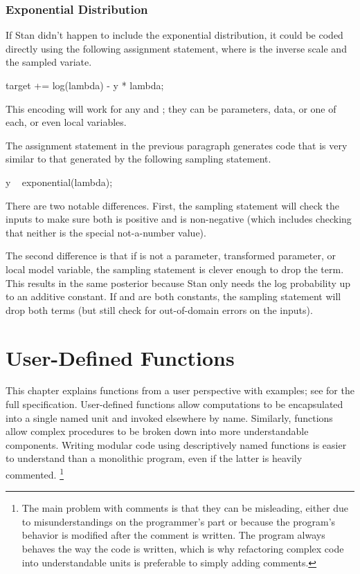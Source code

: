 \subsection{Exponential Distribution}

If Stan didn't happen to include the exponential distribution, it
could be coded directly using the following assignment statement,
where  is the inverse scale and  the sampled
variate.
%
\begin{stancode}
target += log(lambda) - y * lambda;
\end{stancode}
%
This encoding will work for any  and ; they can
be parameters, data, or one of each, or even local variables.

The assignment statement in the previous paragraph generates 
\Cpp code that is very similar to that generated by the following
sampling statement.
%
\begin{stancode}
y ~ exponential(lambda);
\end{stancode}
%
There are two notable differences.  First, the sampling statement will
check the inputs to make sure both  is positive and
 is non-negative (which includes checking that neither is the
special not-a-number value).

The second difference is that if  is not a parameter,
transformed parameter, or local model variable, the sampling statement
is clever enough to drop the  term.  This results in
the same posterior because Stan only needs the log probability up to
an additive constant.  If  and  are both
constants, the sampling statement will drop both terms (but still
check for out-of-domain errors on the inputs).


\chapter{User-Defined Functions}\label{functions-programming.chapter}

\noindent
This chapter explains functions from a user perspective with examples;
see  for the full specification.  User-defined
functions allow computations to be encapsulated into a single named
unit and invoked elsewhere by name.  Similarly, functions allow
complex procedures to be broken down into more understandable
components.  Writing modular code using descriptively named functions
is easier to understand than a monolithic program, even if the latter
is heavily commented.%
%
\footnote{The main problem with comments is that they can be
  misleading, either due to misunderstandings on the programmer's part
  or because the program's behavior is modified after the comment is
  written.  The program always behaves the way the code is written,
  which is why refactoring complex code into understandable units is
  preferable to simply adding comments.}

